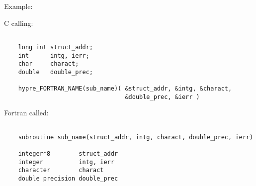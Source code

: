 \noindent Example:

\vspace{0.1in}

  C calling:
\begin{verbatim}

    long int struct_addr;
    int      intg, ierr;
    char     charact;
    double   double_prec;

    hypre_FORTRAN_NAME(sub_name)( &struct_addr, &intg, &charact,
                                  &double_prec, &ierr )

\end{verbatim}

  Fortran called:
\begin{verbatim}

    subroutine sub_name(struct_addr, intg, charact, double_prec, ierr)

    integer*8        struct_addr
    integer          intg, ierr
    character        charact
    double precision double_prec

\end{verbatim}

